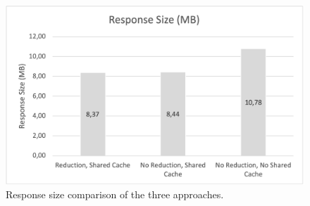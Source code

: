 \ifshowImages
\begin{figure}[H]
\centering
\includegraphics[width=0.8\linewidth]{images/discussion/response-size.png}
\caption{Response size comparison of the three approaches.}\label{fig:discussion:response-size}
\end{figure}
\fi

